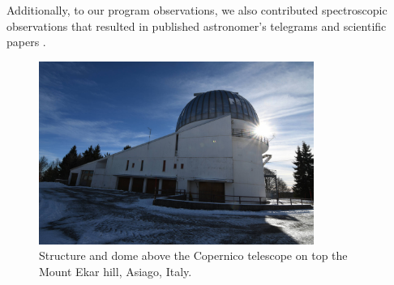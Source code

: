 Additionally, to our program observations, we also contributed spectroscopic observations that resulted in published astronomer's telegrams \cite{2019ATel13340....1M} and scientific papers \cite{2019MNRAS.488.5536M}.

\begin{figure}
	\centering
	\includegraphics[width=0.8\textwidth]{DSC_8199.JPG}
	\caption{Structure and dome above the Copernico telescope on top the Mount Ekar hill, Asiago, Italy.}
	\label{fig:copernico_obs}
\end{figure}